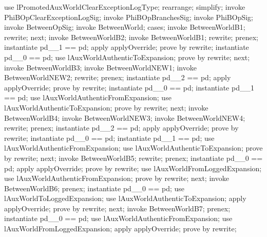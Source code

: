 \begin{LPScript}\begin{zproof}[lPromotedBetweenWorldClearExceptionLogType]
    use lPromotedAuxWorldClearExceptionLogType;
    rearrange;
    simplify;
    invoke PhiBOpClearExceptionLogSig;
    invoke PhiBOpBranchesSig;
    invoke PhiBOpSig;
    invoke BetweenOpSig;
    invoke BetweenWorld;
    cases;
        invoke BetweenWorldB1;
        rewrite;
    next;
        invoke BetweenWorldB2;
        invoke BetweenWorldB1;
        rewrite;
        prenex;
        instantiate pd\_\_1 == pd;
        apply applyOverride;
        prove by rewrite;
        instantiate pd\_\_0 == pd;
        use lAuxWorldAuthenticToExpansion;
        prove by rewrite;
    next;
        invoke BetweenWorldB3;
        invoke BetweenWorldNEW1;
        invoke BetweenWorldNEW2;
        rewrite;
        prenex;
        instantiate pd\_\_2 == pd;
        apply applyOverride;
        prove by rewrite;
        instantiate pd\_\_0 == pd;
        instantiate pd\_\_1 == pd;
        use lAuxWorldAuthenticFromExpansion;
        use lAuxWorldAuthenticToExpansion;
        prove by rewrite;
    next;
        invoke BetweenWorldB4;
        invoke BetweenWorldNEW3;
        invoke BetweenWorldNEW4;
        rewrite;
        prenex;
        instantiate pd\_\_2 == pd;
        apply applyOverride;
        prove by rewrite;
        instantiate pd\_\_0 == pd;
        instantiate pd\_\_1 == pd;
        use lAuxWorldAuthenticFromExpansion;
        use lAuxWorldAuthenticToExpansion;
        prove by rewrite;
    next;
        invoke BetweenWorldB5;
        rewrite;
        prenex;
        instantiate pd\_\_0 == pd;
        apply applyOverride;
        prove by rewrite;
        use lAuxWorldFromLoggedExpansion;
        use lAuxWorldAuthenticFromExpansion;
        prove by rewrite;
    next;
        invoke BetweenWorldB6;
        prenex;
        instantiate pd\_\_0 == pd;
        use lAuxWorldToLoggedExpansion;
        use lAuxWorldAuthenticToExpansion;
        apply applyOverride;
        prove by rewrite;
    next;
        invoke BetweenWorldB7;
        prenex;
        instantiate pd\_\_0 == pd;
        use lAuxWorldAuthenticFromExpansion;
        use lAuxWorldFromLoggedExpansion;
        apply applyOverride;
        prove by rewrite;

\end{zproof}
\end{LPScript}
